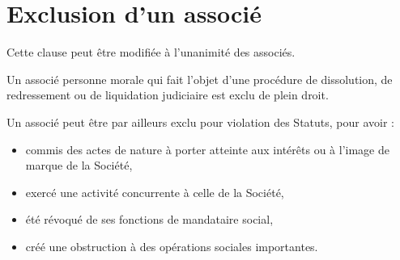 \documentclass[a4paper,12pt]{report}
\begin{document}
%
%
%
%
%
%
%

\section{Exclusion d'un associé}
Cette clause peut être modifiée à l'unanimité des associés.

Un associé personne morale qui fait l'objet d'une procédure de dissolution, de redressement ou de liquidation judiciaire est exclu de plein droit.

Un associé peut être par ailleurs exclu pour violation des Statuts, pour avoir :
\begin{itemize}
	\item commis des actes de nature à porter atteinte aux intérêts ou à l'image de marque de la Société,
	\item exercé une activité concurrente à celle de la Société,
	\item été révoqué de ses fonctions de mandataire social,
	\item créé une obstruction à des opérations sociales importantes.
\end{itemize}
\end{document}
